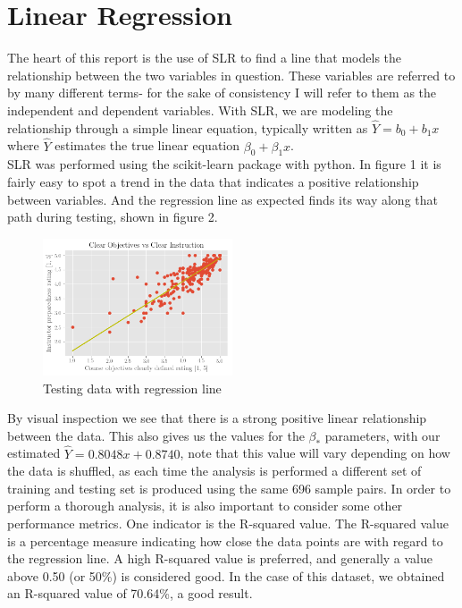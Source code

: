 \documentclass[10pt]{report}
\begin{document}
\newpage
\section*{Linear Regression}

The heart of this report is the use of SLR to find a line that models the relationship between the two variables in question. 
These variables are referred to by many different terms- for the sake of consistency I will refer to them as the independent and
dependent variables.  With SLR, we are modeling the relationship through a simple linear equation, typically written as
$ \hat Y = b_0 + b_1x$ where $\hat Y$ estimates the true linear equation $\beta_0 + \beta_1x$. \\
SLR was performed using the scikit-learn package with python. In figure 1 it is fairly easy to spot a trend in the data that indicates
a positive relationship between variables. And the regression line as expected finds its way along that path during testing, shown in figure 2.


\begin{figure}
    \centering
    \includegraphics[width=0.50\textwidth]{results/third_w_slr}
    \caption{Testing data with regression line}
\end{figure}


By visual inspection we see that there is a strong positive linear relationship between the data. This also gives us the values
for the $\beta_*$ parameters, with our estimated $\hat Y = 0.8048x + 0.8740$, note that this value will vary depending on how the data
is shuffled, as each time the analysis is performed a different set of training and testing set is produced using
the same 696 sample pairs. In order to perform a thorough analysis, it is also important to consider some other performance metrics.
One indicator is the R-squared value. The R-squared value is a percentage measure indicating how close the data points are with regard
to the regression line. A high R-squared value is preferred, and generally a value above 0.50 (or 50\%) is considered good. 
In the case of this dataset, we obtained an R-squared value of 70.64\%, a good result. 
\end{document}
